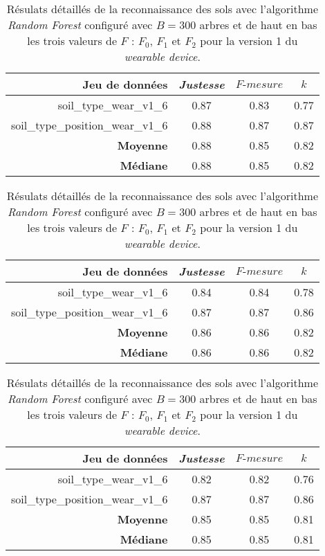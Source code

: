 \begin{table}[H]\renewcommand{\arraystretch}{0.5}
	\centering
	\caption{Résulats détaillés de la reconnaissance des sols avec l'algorithme \textit{Random Forest} configuré avec $B=300$ arbres et de haut en bas les trois valeurs de $F$ : $F_0$, $F_1$ et $F_2$ pour la version 1 du \textit{wearable device}.}
	\label{tab:rf-300-wear-v1}
	\begin{tabular}{@{}rccc@{}}
		\toprule
			\textbf{Jeu de données} & \textit{Justesse} & $F\mbox{-} mesure$ & \textbf{$k$} \\
		\midrule
			soil\_type\_wear\_v1\_6 & 0.87 & 0.83 & 0.77 \\
			soil\_type\_position\_wear\_v1\_6 & 0.88 & 0.87 & 0.87 \\
			\textbf{Moyenne} & 0.88 & 0.85 & 0.82 \\
			\textbf{Médiane} & 0.88 & 0.85 & 0.82 \\
	\end{tabular}
	\begin{tabular}{@{}rccc@{}}
		\toprule
			\textbf{Jeu de données} & \textit{Justesse} & $F\mbox{-} mesure$ & \textbf{$k$} \\
		\midrule
			soil\_type\_wear\_v1\_6 & 0.84 & 0.84 & 0.78 \\
			soil\_type\_position\_wear\_v1\_6 & 0.87 & 0.87 & 0.86 \\
			\textbf{Moyenne} & 0.86 & 0.86 & 0.82 \\
			\textbf{Médiane} & 0.86 & 0.86 & 0.82 \\
	\end{tabular}
	\begin{tabular}{@{}rccc@{}}
		\toprule
			\textbf{Jeu de données} & \textit{Justesse} & $F\mbox{-} mesure$ & \textbf{$k$} \\
		\midrule
			soil\_type\_wear\_v1\_6 & 0.82 & 0.82 & 0.76 \\
			soil\_type\_position\_wear\_v1\_6 & 0.87 & 0.87 & 0.86 \\
			\textbf{Moyenne} & 0.85 & 0.85 & 0.81 \\
			\textbf{Médiane} & 0.85 & 0.85 & 0.81 \\
		\bottomrule
	\end{tabular}
\end{table}

